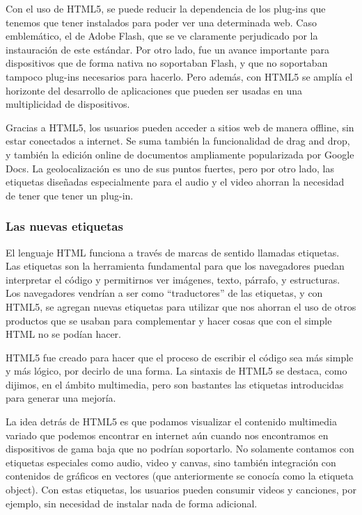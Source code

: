 Con el uso de HTML5, se puede reducir la dependencia de los plug-ins que tenemos que tener instalados para poder ver una determinada web. Caso emblemático, el de Adobe Flash, que se ve claramente perjudicado por la instauración de este estándar. Por otro lado, fue un avance importante para dispositivos que de forma nativa no soportaban Flash, y que no soportaban tampoco plug-ins necesarios para hacerlo. Pero además, con HTML5 se amplía el horizonte del desarrollo de aplicaciones que pueden ser usadas en una multiplicidad de dispositivos.

Gracias a HTML5, los usuarios pueden acceder a sitios web de manera offline, sin estar conectados a internet. Se suma también la funcionalidad de drag and drop, y también la edición online de documentos ampliamente popularizada por Google Docs. La geolocalización es uno de sus puntos fuertes, pero por otro lado, las etiquetas diseñadas especialmente para el audio y el video ahorran la necesidad de tener que tener un plug-in.

\subsubsection{Las nuevas etiquetas}
El lenguaje HTML funciona a través de marcas de sentido llamadas etiquetas. Las etiquetas son la herramienta fundamental para que los navegadores puedan interpretar el código y permitirnos ver imágenes, texto, párrafo, y estructuras. Los navegadores vendrían a ser como “traductores” de las etiquetas, y con HTML5, se agregan nuevas etiquetas para utilizar que nos ahorran el uso de otros productos que se usaban para complementar y hacer cosas que con el simple HTML no se podían hacer. 

HTML5 fue creado para hacer que el proceso de escribir el código sea más simple y más lógico, por decirlo de una forma. La sintaxis de HTML5 se destaca, como dijimos, en el ámbito multimedia, pero son bastantes las etiquetas introducidas para generar una mejoría.

La idea detrás de HTML5 es que podamos visualizar el contenido multimedia variado que podemos encontrar en internet aún cuando nos encontramos en dispositivos de gama baja que no podrían soportarlo. No solamente contamos con etiquetas especiales como audio, video y canvas, sino también integración con contenidos de gráficos en vectores (que anteriormente se conocía como la etiqueta object). Con estas etiquetas, los usuarios pueden consumir videos y canciones, por ejemplo, sin necesidad de instalar nada de forma adicional.

